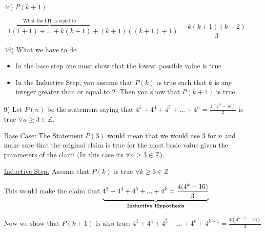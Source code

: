 \documentclass[11pt]{article}
\begin{document}
\begin{flushleft}
\vspace{4mm}

4c) $P(k+1)$

$$ \overbrace{1(1+1)+...+k(k+1)}\limits^{\text{What the I.H. is equal to}} + (k+1)((k+1)+1) = \displaystyle{\frac{k(k+1)(k+2)}{3}}$$

4d) What we have to do

\begin{itemize}
\item In the base step one must show that the lowest possible value is true

\item In the Inductive Step, you assume that $P(k)$ is true such that $k$ is any integer greater than or equal to 2. Then you show that $P(k+1)$ is true.
\end{itemize}

\hrulefill


\vspace{2mm}
9) Let $P(n)$ be the statement saying that $4^3 + 4^4 + 4^5 + ... + 4^n = \displaystyle{\frac{4(4^n -16)}{3}} $ is true $\forall n\geq 3\in \mathbb{Z}$.

\vspace{3mm}

\underline{Base Case:} The Statement $P(3)$ would mean that we would use $3$ for $n$ and make sure that the original claim is true for the most basic value given the parameters of the claim (In this case its $\forall n\geq 3\in \mathbb{Z}$).
 
\vspace{3mm}

\underline{Inductive Step:} Assume that $P(k)$ is true $\forall k\geq 3 \in \mathbb{Z}$

This would make the claim that $\underbrace{4^3 + 4^4 + 4^5 + ... + 4^k = \displaystyle{\frac{4(4^k-16)}{3}}}\limits_{\text{\textbf{Inductive Hypothesis}}}$

$\text{Now we show that $P(k+1)$ is also true: } 4^3 + 4^4 + 4^5 + ... + 4^k+4^{k+1} = \displaystyle{\frac{4(4^{k+1}-16)}{3}}$


\end{flushleft}
\end{document}
